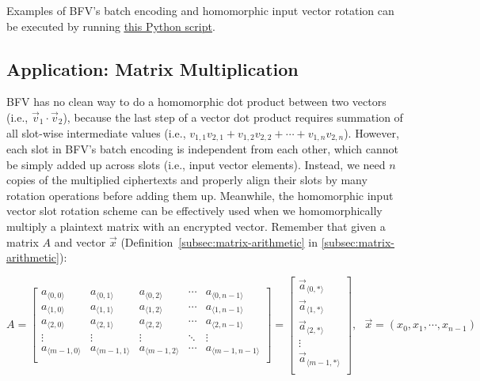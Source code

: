 $ $




 Examples of BFV's batch encoding and homomorphic input vector rotation can be executed by running \href{https://github.com/fhetextbook/fhe-textbook/blob/main/source%20code/bfv.py}{\underline{this Python script}}. 



\subsection{Application: Matrix Multiplication}
\label{subsec:bfv-matrix-multiplication}

BFV has no clean way to do a homomorphic dot product between two vectors (i.e., $\vec{v}_1 \cdot \vec{v}_2$), because the last step of a vector dot product requires summation of all slot-wise intermediate values (i.e., $v_{1,1}v_{2,1} + v_{1,2}v_{2,2} + \cdots + v_{1,n}v_{2,n}$). However, each slot in BFV's batch encoding is independent from each other, which cannot be simply added up across slots (i.e., input vector elements). Instead, we need $n$ copies of the multiplied ciphertexts and properly align their slots by many rotation operations before adding them up. Meanwhile, the homomorphic input vector slot rotation scheme can be effectively used when we homomorphically multiply a plaintext matrix with an encrypted vector. Remember that given a matrix $A$ and vector $\vec{x}$ (Definition~\ref*{subsec:matrix-arithmetic} in \autoref{subsec:matrix-arithmetic}):

$A = \begin{bmatrix}
 a_{\langle 0, 0\rangle} & a_{\langle 0, 1\rangle} & a_{\langle 0, 2\rangle} & \cdots & a_{\langle 0, n-1\rangle}\\
 a_{\langle 1, 0\rangle} & a_{\langle 1, 1\rangle} & a_{\langle 1, 2\rangle} & \cdots & a_{\langle 1, n-1\rangle} \\
 a_{\langle 2, 0\rangle} & a_{\langle 2, 1\rangle} & a_{\langle 2, 2\rangle} & \cdots & a_{\langle 2, n-1\rangle} \\
\vdots & \vdots & \vdots & \ddots & \vdots \\
 a_{\langle m-1, 0\rangle} & a_{\langle m-1, 1\rangle} & a_{\langle m-1, 2\rangle} & \cdots & a_{\langle m-1, n-1\rangle} \\
\end{bmatrix} = \begin{bmatrix} 
\vec{a}_{\langle 0, * \rangle} \\ 
\vec{a}_{\langle 1, * \rangle} \\ 
\vec{a}_{\langle 2, * \rangle} \\ 
\vdots\\
\vec{a}_{\langle m-1, * \rangle} \\ 
\end{bmatrix}, \text{ } \vec{x} = (x_0, x_1, \cdots, x_{n-1})$

